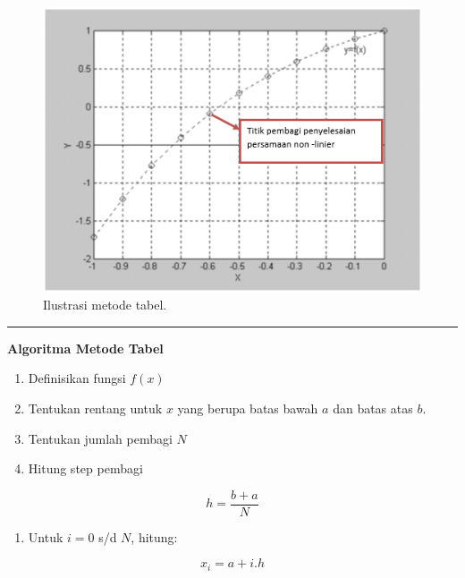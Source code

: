 \documentclass[]{book}
\providecommand{\tightlist}{%
  \setlength{\itemsep}{0pt}\setlength{\parskip}{0pt}}
\theoremstyle{definition}
\theoremstyle{definition}
\theoremstyle{definition}
\theoremstyle{remark}
\begin{document}
\begin{figure}

{\centering \includegraphics[width=0.8\linewidth]{./images/tabelviz} 

}

\caption{Ilustrasi metode tabel.}\label{fig:tabelviz}
\end{figure}

\begin{center}\rule{0.5\linewidth}{\linethickness}\end{center}

\textbf{Algoritma Metode Tabel}

\begin{enumerate}
\def\labelenumi{\arabic{enumi}.}
\tightlist
\item
  Definisikan fungsi \(f\left(x \right)\)
\item
  Tentukan rentang untuk \(x\) yang berupa batas bawah \(a\) dan batas atas \(b\).
\item
  Tentukan jumlah pembagi \(N\)
\item
  Hitung step pembagi
\end{enumerate}

\begin{equation}
h=\frac{b+a}{N}
  \label{eq:tabel1}
\end{equation}

\begin{enumerate}
\def\labelenumi{\arabic{enumi}.}
\setcounter{enumi}{4}
\tightlist
\item
  Untuk \(i=0\) s/d \(N\), hitung:
\end{enumerate}

\begin{equation}
x_i=a+i.h
  \label{eq:tabel2}
\end{equation}
\end{document}
